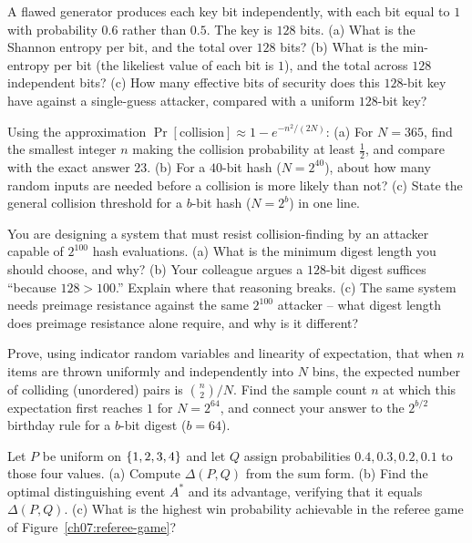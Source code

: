 \begin{exercise}
\label{ch07:ex-biased-key}
A flawed generator produces each key bit independently, with each bit equal to $1$ with probability $0.6$ rather than $0.5$. The key is $128$ bits. (a) What is the Shannon entropy per bit, and the total over $128$ bits? (b) What is the min-entropy per bit (the likeliest value of each bit is $1$), and the total across $128$ independent bits? (c) How many effective bits of security does this $128$-bit key have against a single-guess attacker, compared with a uniform $128$-bit key?
\end{exercise}

\begin{exercise}
\label{ch07:ex-birthday}
Using the approximation $\Pr[\text{collision}] \approx 1 - e^{-n^2/(2N)}$: (a) For $N = 365$, find the smallest integer $n$ making the collision probability at least $\frac{1}{2}$, and compare with the exact answer $23$. (b) For a $40$-bit hash ($N = 2^{40}$), about how many random inputs are needed before a collision is more likely than not? (c) State the general collision threshold for a $b$-bit hash ($N = 2^b$) in one line.
\end{exercise}

\begin{exercise}
\label{ch07:ex-sizing}
You are designing a system that must resist collision-finding by an attacker capable of $2^{100}$ hash evaluations. (a) What is the minimum digest length you should choose, and why? (b) Your colleague argues a $128$-bit digest suffices ``because $128 > 100$.'' Explain where that reasoning breaks. (c) The same system needs preimage resistance against the same $2^{100}$ attacker -- what digest length does preimage resistance alone require, and why is it different?
\end{exercise}

\begin{exercise}
\label{ch07:ex-indicator}
Prove, using indicator random variables and linearity of expectation, that when $n$ items are thrown uniformly and independently into $N$ bins, the expected number of colliding (unordered) pairs is $\binom{n}{2}/N$. Find the sample count $n$ at which this expectation first reaches $1$ for $N = 2^{64}$, and connect your answer to the $2^{b/2}$ birthday rule for a $b$-bit digest ($b = 64$).
\end{exercise}

\begin{exercise}
\label{ch07:ex-statdist}
Let $P$ be uniform on $\{1,2,3,4\}$ and let $Q$ assign probabilities $0.4, 0.3, 0.2, 0.1$ to those four values. (a) Compute $\Delta(P, Q)$ from the sum form. (b) Find the optimal distinguishing event $A^*$ and its advantage, verifying that it equals $\Delta(P, Q)$. (c) What is the highest win probability achievable in the referee game of Figure~\ref{ch07:referee-game}?
\end{exercise}

